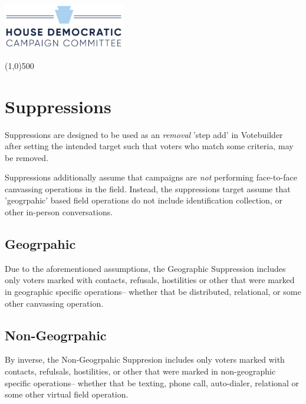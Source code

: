 \documentclass[12pt]{article}
\begin{document}
\begin{center}
    \includegraphics[width=0.4\textwidth]{HDCC}
\end{center}

\begin{center}
    \line(1,0){500}
\end{center}

\section*{Suppressions}

Suppressions are designed to be used as an \textit{removal} 'step add' in Votebuilder after setting the intended target such that voters who match some criteria, may be removed.

Suppressions additionally assume that campaigns are \textit{not} performing face-to-face canvassing operations in the field. Instead, the suppressions target assume that 'geogrpahic' based field operations do not include identification collection, or other in-person conversations. 

\subsection*{Geogrpahic}

Due to the aforementioned assumptions, the Geographic Suppression includes only voters marked with contacts, refusals, hostilities or other that were marked in geographic specific operations-- whether that be distributed, relational, or some other canvassing operation.

\subsection*{Non-Geogrpahic}

By inverse, the Non-Geogrpahic Suppresion includes only voters marked with contacts, refulsals, hostilities, or other that were marked in non-geographic specific operations-- whether that be texting, phone call, auto-dialer, relational or some other virtual field operation. 
\end{document}
